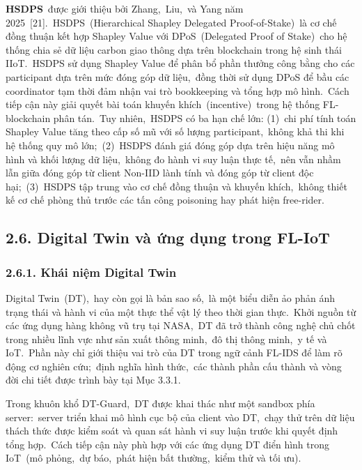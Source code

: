 \textbf{HSDPS}~được giới thiệu bởi Zhang,~Liu,~và Yang năm 2025~{[}21{]}.~HSDPS~(Hierarchical Shapley Delegated Proof-of-Stake)~là cơ chế đồng thuận kết hợp Shapley Value với DPoS~(Delegated Proof of Stake)~cho hệ thống chia sẻ dữ liệu carbon giao thông dựa trên blockchain trong hệ sinh thái IIoT.~HSDPS sử dụng Shapley Value để phân bổ phần thưởng công bằng cho các participant dựa trên mức đóng góp dữ liệu,~đồng thời sử dụng DPoS để bầu các coordinator tạm thời đảm nhận vai trò bookkeeping và tổng hợp mô hình.~Cách tiếp cận này giải quyết bài toán khuyến khích~(incentive)~trong hệ thống FL-blockchain phân tán.~Tuy nhiên,~HSDPS có ba hạn chế lớn: (1)~chi phí tính toán Shapley Value tăng theo cấp số mũ với số lượng participant,~không khả thi khi hệ thống quy mô lớn;~(2)~HSDPS đánh giá đóng góp dựa trên hiệu năng mô hình và khối lượng dữ liệu,~không đo hành vi suy luận thực tế,~nên vẫn nhầm lẫn giữa đóng góp từ client Non-IID lành tính và đóng góp từ client độc hại;~(3)~HSDPS tập trung vào cơ chế đồng thuận và khuyến khích,~không thiết kế cơ chế phòng thủ trước các tấn công poisoning hay phát hiện free-rider.

\subsection{2.6. Digital Twin và ứng dụng trong FL-IoT}\label{digital-twin-vuxe0-ux1ee9ng-dux1ee5ng-trong-fl-iot}

\subsubsection{2.6.1. Khái niệm Digital Twin}\label{khuxe1i-niux1ec7m-digital-twin}

Digital Twin~(DT),~hay còn gọi là bản sao số,~là một biểu diễn ảo phản ánh trạng thái và hành vi của một thực thể vật lý theo thời gian thực.~Khởi nguồn từ các ứng dụng hàng không vũ trụ tại NASA,~DT đã trở thành công nghệ chủ chốt trong nhiều lĩnh vực như sản xuất thông minh,~đô thị thông minh,~y tế và IoT.~Phần này chỉ giới thiệu vai trò của DT trong ngữ cảnh FL-IDS để làm rõ động cơ nghiên cứu;~định nghĩa hình thức,~các thành phần cấu thành và vòng đời chi tiết được trình bày tại Mục 3.3.1.

Trong khuôn khổ DT-Guard,~DT được khai thác như một sandbox phía server:~server triển khai mô hình cục bộ của client vào DT,~chạy thử trên dữ liệu thách thức được kiểm soát và quan sát hành vi suy luận trước khi quyết định tổng hợp.~Cách tiếp cận này phù hợp với các ứng dụng DT điển hình trong IoT~(mô phỏng,~dự báo,~phát hiện bất thường,~kiểm thử và tối ưu).

